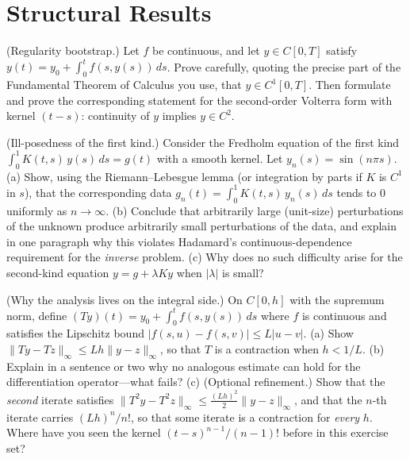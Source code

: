 \documentclass{essay}
\begin{document}
\section{Structural Results}

\begin{exercise}\label{ex:bootstrap}
  (Regularity bootstrap.) Let $f$ be continuous, and let $y \in C[0, T]$ satisfy $y(t) = y_0 + \int_0^t f(s, y(s))\,ds$. Prove carefully, quoting the precise part of the Fundamental Theorem of Calculus you use, that $y \in C^1[0,T]$. Then formulate and prove the corresponding statement for the second-order Volterra form with kernel $(t - s)$: continuity of $y$ implies $y \in C^2$.
\end{exercise}

\begin{exercise}\label{ex:illposed}
  (Ill-posedness of the first kind.) Consider the Fredholm equation of the first kind $\int_0^1 K(t,s)\, y(s)\, ds = g(t)$ with a smooth kernel. Let $y_n(s) = \sin(n\pi s)$. (a) Show, using the Riemann--Lebesgue lemma (or integration by parts if $K$ is $C^1$ in $s$), that the corresponding data $g_n(t) = \int_0^1 K(t,s)\, y_n(s)\, ds$ tends to $0$ uniformly as $n \to \infty$. (b) Conclude that arbitrarily large (unit-size) perturbations of the unknown produce arbitrarily small perturbations of the data, and explain in one paragraph why this violates Hadamard's continuous-dependence requirement for the \emph{inverse} problem. (c) Why does no such difficulty arise for the second-kind equation $y = g + \lambda K y$ when $|\lambda|$ is small?
\end{exercise}

\begin{exercise}\label{ex:contraction}
  (Why the analysis lives on the integral side.) On $C[0, h]$ with the supremum norm, define $(Ty)(t) = y_0 + \int_0^t f(s, y(s))\,ds$ where $f$ is continuous and satisfies the Lipschitz bound $|f(s, u) - f(s, v)| \le L|u - v|$. (a) Show $\|Ty - Tz\|_\infty \le Lh \|y - z\|_\infty$, so that $T$ is a contraction when $h < 1/L$. (b) Explain in a sentence or two why no analogous estimate can hold for the differentiation operator---what fails? (c) (Optional refinement.) Show that the \emph{second} iterate satisfies $\|T^2 y - T^2 z\|_\infty \le \frac{(Lh)^2}{2}\|y - z\|_\infty$, and that the $n$-th iterate carries $(Lh)^n/n!$, so that some iterate is a contraction for \emph{every} $h$. Where have you seen the kernel $(t-s)^{n-1}/(n-1)!$ before in this exercise set?
\end{exercise}
\end{document}
